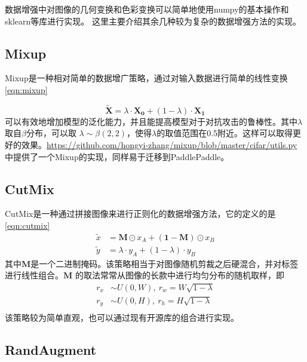 \documentclass[a4paper,twoside,zihao=5,UTF8]{ctexrep}
\newcommand{\bvec}[1]{\mathbf{#1}}
\begin{document}
数据增强中对图像的几何变换和色彩变换可以简单地使用numpy的基本操作和sklearn等库进行实现。
这里主要介绍其余几种较为复杂的数据增强方法的实现。

\subsection{Mixup}

Mixup\cite{mixup}是一种相对简单的数据增广策略，通过对输入数据进行简单的线性变换\eqref{eqn:mixup}

\begin{equation}
    \label{eqn:mixup}
    \widetilde{\bvec{X}}=\lambda\cdot\bvec{X_0}+(1-\lambda)\cdot\bvec{X_1}
\end{equation}
可以有效地增加模型的泛化能力，并且能提高模型对于对抗攻击的鲁棒性。其中$\lambda$取自$\beta$分布，可以取
$\lambda \sim \beta(2,2)$，使得$\lambda$的取值范围在0.5附近。这样可以取得更好的效果。\url{https://github.com/hongyi-zhang/mixup/blob/master/cifar/utils.py}
中提供了一个Mixup的实现，同样易于迁移到PaddlePaddle。

\subsection{CutMix}
CutMix\cite{cutmix}是一种通过拼接图像来进行正则化的数据增强方法，它的定义的是\eqref{eqn:cutmix}
\begin{equation}
    \label{eqn:cutmix}
    \begin{aligned}
        \widetilde{x}&=\bvec{M}\odot x_A+(\bvec{1}-\bvec{M})\odot x_B \\
        \widetilde{y}&=\lambda\cdot y_A+(1-\lambda)\cdot y_B 
    \end{aligned}
\end{equation}
其中$\bvec{M}$是一个二进制掩码。该策略相当于对图像随机剪裁之后硬混合，并对标签进行线性组合。$\bvec{M}$
的取法常常从图像的长款中进行均匀分布的随机取样，即
\begin{equation}
    \label{eqn:cutmix_mask}
    \begin{aligned}
        r_x &\sim U(0,W),\ r_w=W\sqrt{1-\lambda} \\
        r_y &\sim U(0,H),\ r_h=H\sqrt{1-\lambda} \\
    \end{aligned}
\end{equation}
该策略较为简单直观，也可以通过现有开源库的组合进行实现。

\subsection{RandAugment}
\end{document}
